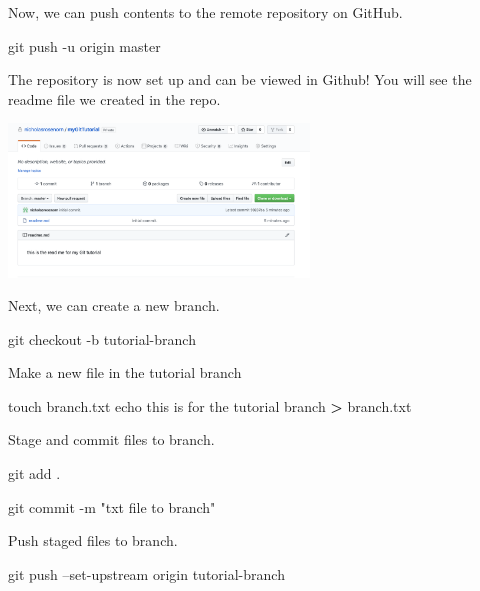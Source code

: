 \documentclass[]{book}
\newenvironment{Shaded}{\begin{snugshade}}{\end{snugshade}}
\newcommand{\StringTok}[1]{\textcolor[rgb]{0.31,0.60,0.02}{#1}}
\newcommand{\FunctionTok}[1]{\textcolor[rgb]{0.00,0.00,0.00}{#1}}
\newcommand{\OperatorTok}[1]{\textcolor[rgb]{0.81,0.36,0.00}{\textbf{#1}}}
\newcommand{\BuiltInTok}[1]{#1}
\newcommand{\NormalTok}[1]{#1}
\begin{document}
Now, we can push contents to the remote repository on GitHub.

\begin{Shaded}
\begin{Highlighting}[]
\FunctionTok{git}\NormalTok{ push -u origin master}
\end{Highlighting}
\end{Shaded}

The repository is now set up and can be viewed in Github! You will see
the readme file we created in the repo.

\includegraphics[width=0.60000\textwidth]{images/github view.png}

Next, we can create a new branch.

\begin{Shaded}
\begin{Highlighting}[]
\FunctionTok{git}\NormalTok{ checkout -b tutorial-branch}
\end{Highlighting}
\end{Shaded}

Make a new file in the tutorial branch

\begin{Shaded}
\begin{Highlighting}[]
\FunctionTok{touch}\NormalTok{ branch.txt}
\BuiltInTok{echo}\NormalTok{ this is for the tutorial branch }\OperatorTok{>}\NormalTok{ branch.txt}
\end{Highlighting}
\end{Shaded}

Stage and commit files to branch.

\begin{Shaded}
\begin{Highlighting}[]
\FunctionTok{git}\NormalTok{ add .}

\FunctionTok{git}\NormalTok{ commit -m }\StringTok{"txt file to branch"}
\end{Highlighting}
\end{Shaded}

Push staged files to branch.

\begin{Shaded}
\begin{Highlighting}[]
\FunctionTok{git}\NormalTok{ push --set-upstream origin tutorial-branch}
\end{Highlighting}
\end{Shaded}
\end{document}
